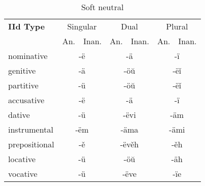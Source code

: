 \begin{table}[!htb]
	\caption{Soft neutral}
	\begin{tabular}{lllllll}
		\textbf{IId Type}       
		& \multicolumn{2}{c}{Singular} 
		& \multicolumn{2}{c}{Dual} 
		& \multicolumn{2}{c}{Plural} \\
		& An.   & Inan.  & An.   & Inan.   & An.  & Inan. \\
		\gls{nominative}    & \multicolumn{2}{c}{-ë}      
		& \multicolumn{2}{c}{-ä}        
		& \multicolumn{2}{c}{-ï} \\
		\gls{genitive}      & \multicolumn{2}{c}{-ä}       
		& \multicolumn{2}{c}{-öŭ}      
		& \multicolumn{2}{c}{-ëǐ}   \\
		\gls{partitive}     & \multicolumn{2}{c}{-ü}       
		& \multicolumn{2}{c}{-öŭ}      
		& \multicolumn{2}{c}{-ëǐ} \\
		\gls{accusative}    & \multicolumn{2}{c}{-ë}     
		& \multicolumn{2}{c}{-ä} 
		& \multicolumn{2}{c}{-ï} \\
		\gls{dative}		  & \multicolumn{2}{c}{-ü}       
		& \multicolumn{2}{c}{-ëvi}     
		& \multicolumn{2}{c}{-äm} \\
		\gls{instrumental}  & \multicolumn{2}{c}{-ëm}     
		& \multicolumn{2}{c}{-äma}     
		& \multicolumn{2}{c}{-ämi} \\
		\gls{prepositional} & \multicolumn{2}{c}{-ě}       
		& \multicolumn{2}{c}{-ëvěh}     
		& \multicolumn{2}{c}{-ěh} \\
		\gls{locative}      & \multicolumn{2}{c}{-ü}      
		& \multicolumn{2}{c}{-öŭ}       
		& \multicolumn{2}{c}{-äh} \\ 
		\gls{vocative}      & \multicolumn{2}{c}{-ü}       
		& \multicolumn{2}{c}{-ëve}      
		& \multicolumn{2}{c}{-ïe}
	\end{tabular}
\end{table}

